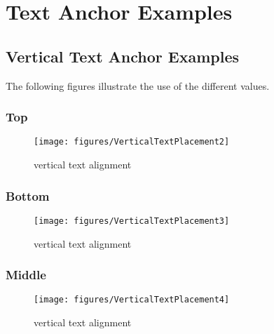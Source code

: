
\section{Text Anchor Examples}
\label{apdx-text-anchor}

\subsection{Vertical Text Anchor Examples}

The following figures illustrate the use of the different \VTextAnchor values. 

\subsubsection{Top}

\begin{figure}[h!]
\begin{center}
\texttt{[image: figures/VerticalTextPlacement2]}
\end{center}
\caption{vertical text alignment }
\label{VerticalTextPlacement2}
\end{figure}

\subsubsection{Bottom}

\begin{figure}[h!]
\begin{center}
\texttt{[image: figures/VerticalTextPlacement3]}
\end{center}
\caption{vertical text alignment }
\label{VerticalTextPlacement3}
\end{figure}

\clearpage

\subsubsection{Middle}

\begin{figure}[h!]
\begin{center}
\texttt{[image: figures/VerticalTextPlacement4]}
\end{center}
\caption{vertical text alignment }
\label{VerticalTextPlacement4}
\end{figure}

